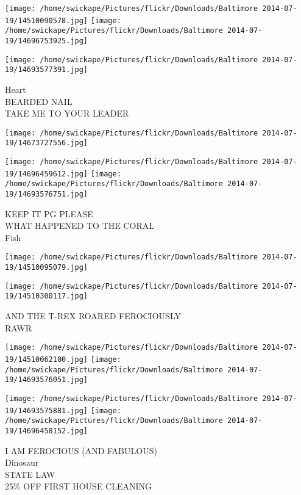 \documentclass[10pt,letterpaper]{article}
\begin{document}
\texttt{[image: /home/swickape/Pictures/flickr/Downloads/Baltimore 2014-07-19/14510090578.jpg]}
\texttt{[image: /home/swickape/Pictures/flickr/Downloads/Baltimore 2014-07-19/14696753925.jpg]}

\texttt{[image: /home/swickape/Pictures/flickr/Downloads/Baltimore 2014-07-19/14693577391.jpg]}

Heart\\
BEARDED NAIL\\
TAKE ME TO YOUR LEADER\\
\pagebreak

\texttt{[image: /home/swickape/Pictures/flickr/Downloads/Baltimore 2014-07-19/14673727556.jpg]}

\vspace{0.25in}
\texttt{[image: /home/swickape/Pictures/flickr/Downloads/Baltimore 2014-07-19/14696459612.jpg]}
\texttt{[image: /home/swickape/Pictures/flickr/Downloads/Baltimore 2014-07-19/14693576751.jpg]}

KEEP IT PG PLEASE\\
WHAT HAPPENED TO THE CORAL\\
Fish\\
\pagebreak

\texttt{[image: /home/swickape/Pictures/flickr/Downloads/Baltimore 2014-07-19/14510095079.jpg]}

\vspace{0.25in}
\texttt{[image: /home/swickape/Pictures/flickr/Downloads/Baltimore 2014-07-19/14510300117.jpg]}

AND THE T{-}REX ROARED FEROCIOUSLY\\
RAWR\\
\pagebreak

\texttt{[image: /home/swickape/Pictures/flickr/Downloads/Baltimore 2014-07-19/14510062100.jpg]}
\texttt{[image: /home/swickape/Pictures/flickr/Downloads/Baltimore 2014-07-19/14693576051.jpg]}

\texttt{[image: /home/swickape/Pictures/flickr/Downloads/Baltimore 2014-07-19/14693575881.jpg]}
\texttt{[image: /home/swickape/Pictures/flickr/Downloads/Baltimore 2014-07-19/14696458152.jpg]}

I AM FEROCIOUS (AND FABULOUS)\\
Dinosaur\\
STATE LAW\\
25\% OFF FIRST HOUSE CLEANING\\
\pagebreak
\end{document}
